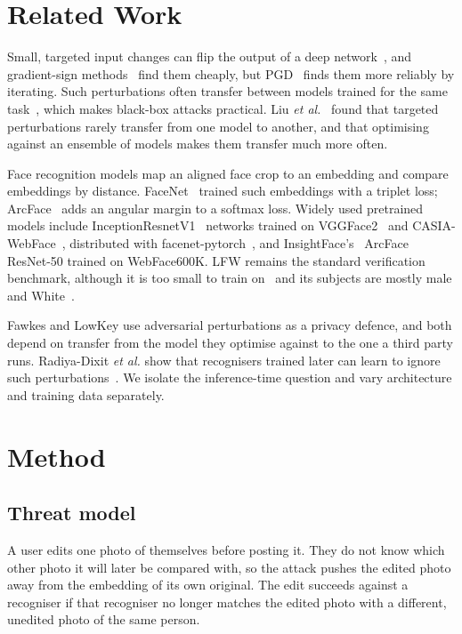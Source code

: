 \documentclass[conference]{IEEEtran}
\begin{document}
\section{Related Work}
Small, targeted input changes can flip the output of a deep network~\cite{szegedy2014}, and gradient-sign
methods~\cite{fgsm} find them cheaply, but PGD~\cite{madry} finds them more reliably by iterating. Such perturbations often transfer between models
trained for the same task~\cite{papernot}, which makes black-box attacks practical. Liu \emph{et
al.}~\cite{liu2017} found that targeted perturbations rarely transfer from one model to another, and that
optimising against an ensemble of models makes them transfer much more often.

Face recognition models map an aligned face crop to an embedding and compare embeddings by distance.
FaceNet~\cite{facenet} trained such embeddings with a triplet loss; ArcFace~\cite{arcface} adds an angular margin to
a softmax loss. Widely used pretrained models include InceptionResnetV1~\cite{inceptionv4} networks trained on
VGGFace2~\cite{vggface2} and CASIA-WebFace~\cite{casia}, distributed with facenet-pytorch~\cite{facenetpytorch},
and InsightFace's~\cite{insightface} ArcFace ResNet-50 trained on WebFace600K. LFW remains
the standard verification benchmark, although it is too small to train on~\cite{deepid2} and its subjects are
mostly male and White~\cite{hanjain}.

Fawkes and LowKey use adversarial perturbations as a privacy defence, and both depend on transfer from the model
they optimise against to the one a third party runs. Radiya-Dixit \emph{et al.} show that recognisers trained
later can learn to ignore such perturbations~\cite{radiya}. We isolate the inference-time question and vary architecture and
training data separately.

\section{Method}
\subsection{Threat model}
A user edits one photo of themselves before posting it. They do not know which other photo it will later be
compared with, so the attack pushes the edited photo away from the embedding of its own original. The edit
succeeds against a recogniser if that recogniser no longer matches the edited photo with a different, unedited
photo of the same person.
\end{document}
